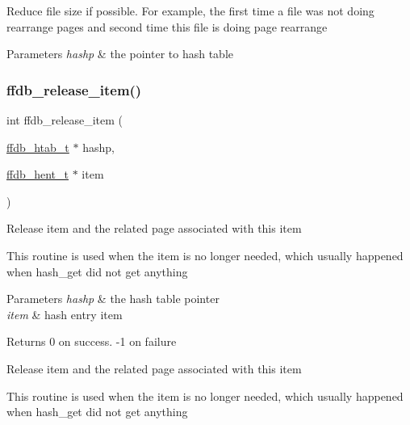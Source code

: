 Reduce file size if possible. For example, the first time a file was not doing rearrange pages and second time this file is doing page rearrange


\begin{DoxyParams}{Parameters}
{\em hashp} & the pointer to hash table \\
\hline
\end{DoxyParams}
\mbox{\label{adat-devel_2other__libs_2filedb_2filehash_2ffdb__hash_8h_abcfe17261335c76475086e59ab020290}} 
\subsubsection{\texorpdfstring{ffdb\_release\_item()}{ffdb\_release\_item()}}
{\footnotesize\ttfamily int ffdb\+\_\+release\+\_\+item (\begin{DoxyParamCaption}\item[{\mbox{\hyperlink{adat-devel_2other__libs_2filedb_2filehash_2ffdb__hash_8h_ae592010ed2bedc975d3cc0b7d074b9d1}{ffdb\+\_\+htab\+\_\+t}} $\ast$}]{hashp,  }\item[{\mbox{\hyperlink{adat-devel_2other__libs_2filedb_2filehash_2ffdb__hash_8h_aa1cea5ccbd6513ed152988f7a71a936d}{ffdb\+\_\+hent\+\_\+t}} $\ast$}]{item }\end{DoxyParamCaption})}

Release item and the related page associated with this item

This routine is used when the item is no longer needed, which usually happened when hash\+\_\+get did not get anything


\begin{DoxyParams}{Parameters}
{\em hashp} & the hash table pointer \\
\hline
{\em item} & hash entry item\\
\hline
\end{DoxyParams}
\begin{DoxyReturn}{Returns}
0 on success. -\/1 on failure
\end{DoxyReturn}
Release item and the related page associated with this item

This routine is used when the item is no longer needed, which usually happened when hash\+\_\+get did not get anything \mbox{\label{adat-devel_2other__libs_2filedb_2filehash_2ffdb__hash_8h_a187d2e04a74842fa855ee5799174d260}} 
